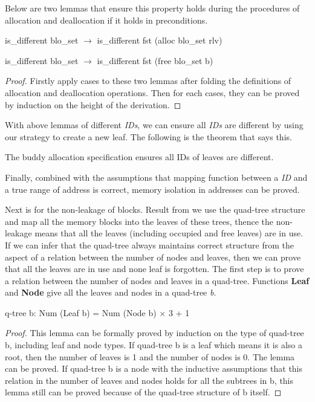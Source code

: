 Below are two lemmas that ensure this property holds during the procedures of allocation and deallocation if it holds in preconditions.

\begin{lemma}
	is\_different blo\_set $\longrightarrow$ is\_different fst (alloc blo\_set rlv)
\end{lemma}

\begin{lemma}
	is\_different blo\_set $\longrightarrow$ is\_different fst (free blo\_set b)
\end{lemma}

\begin{proof}
	Firstly apply cases to these two lemmas after folding the definitions of allocation and deallocation operations. Then for each cases, they can be proved by induction on the height of the derivation.
\end{proof}

With above lemmas of different \emph{IDs}, we can ensure all \emph{IDs} are different by using our strategy to create a new leaf. The following is the theorem that says this.

\begin{theorem}
	The buddy allocation specification ensures all IDs of leaves are different.
\end{theorem}

Finally, combined with the assumptions that mapping function between a \emph{ID} and a true range of address is correct, memory isolation in addresses can be proved.

Next is for the non-leakage of blocks. Result from we use the quad-tree structure and map all the memory blocks into the leaves of these trees, thence the non-leakage means that all the leaves (including occupied and free leaves) are in use. If we can infer that the quad-tree always maintains correct structure from the aspect of a relation between the number of nodes and leaves, then we can prove that all the leaves are in use and none leaf is forgotten. The first step is to prove a relation between the number of nodes and leaves in a quad-tree. Functions \textbf{Leaf} and \textbf{Node} give all the leaves and nodes in a quad-tree \emph{b}.

\begin{lemma}
	q-tree b: Num (Leaf b) = Num (Node b) $\times$ 3 + 1
\end{lemma}

\begin{proof}
	This lemma can be formally proved by induction on the type of quad-tree b, including leaf and node types. If quad-tree b is a leaf which means it is also a root, then the number of leaves is 1 and the number of nodes is 0. The lemma can be proved. If quad-tree b is a node with the inductive assumptions that this relation in the number of leaves and nodes holds for all the subtrees in b, this lemma still can be proved because of the quad-tree structure of b itself.
\end{proof}

